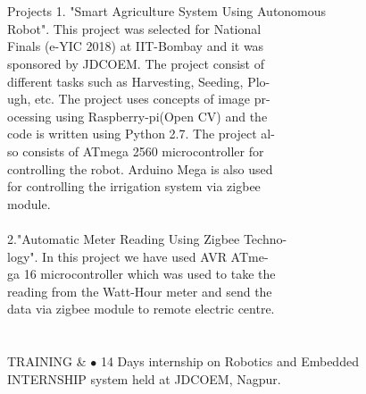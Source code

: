 \documentclass[10pt]{article}
\begin{document}
\begin{flushleft}
	\indent \\
	\indent \\
	\indent Projects \hspace{1.1in}1. "Smart Agriculture System Using Autonomous\\ 
	\indent \hspace {1.85in}Robot". This project was selected for National \\
	\indent \hspace {1.8in}  Finals (e-YIC 2018) at IIT-Bombay and it was \\
	\indent \hspace {1.8in}  sponsored by JDCOEM. The project consist of \\
	\indent \hspace {1.8in}  different tasks such as Harvesting, Seeding, Plo-\\
	\indent \hspace {1.82in}  ugh, etc. The project uses concepts of image pr-\\
	\indent \hspace {1.8in} ocessing using Raspberry-pi(Open CV) and the \\
	\indent \hspace {1.79in}   code is written using Python 2.7. The project al-\\
	\indent \hspace {1.79in}  so consists  of ATmega 2560 microcontroller for \\
	\indent \hspace {1.78in}   controlling  the robot. Arduino Mega is also used \\
	\indent \hspace {1.8in}   for controlling the irrigation system via zigbee \\
	\indent \hspace {1.78in} module.\\
	
	\indent\\

	\indent  \hspace{1.65in}2."Automatic Meter Reading Using Zigbee Techno-\\
	\indent \hspace {1.78in} logy". In this project we have used AVR ATme-\\
	\indent \hspace {1.78in}  ga 16 microcontroller which was used to take the\\
	\indent \hspace {1.78in}  reading from the Watt-Hour meter and send the\\
	\indent \hspace {1.78in}   data via zigbee module to remote electric centre.\\
	\indent\\
	\indent \\
	\indent TRAINING \& \hspace{0.74in}$\bullet$ 14 Days internship on Robotics and Embedded\\
	\indent INTERNSHIP\hspace {0.9in} system  held at JDCOEM, Nagpur.\\
	

\end{flushleft}
\end{document}
